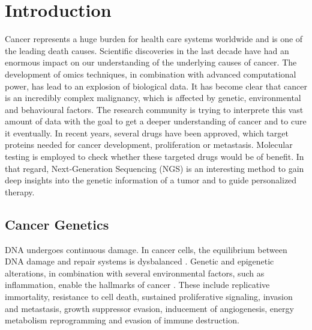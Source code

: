 \section{Introduction}

  Cancer represents a huge burden for health care systems worldwide and is one
  of the leading death causes. Scientific discoveries in the last decade have
  had an enormous impact on our understanding of the underlying causes of
  cancer. The development of omics techniques, in combination with advanced
  computational power, has lead to an explosion of biological data. It has
  become clear that cancer is an incredibly complex malignancy, which is
  affected by genetic, environmental and behavioural factors. The research
  community is trying to interprete this vast amount of data with the goal to
  get a deeper understanding of cancer and to cure it eventually. In recent
  years, several drugs have been approved, which target proteins needed for
  cancer development, proliferation or metastasis. Molecular testing is employed
  to check whether these targeted drugs would be of benefit. In that regard,
  Next-Generation Sequencing (NGS) is an interesting method to gain deep
  insights into the genetic information of a tumor and to guide personalized
  therapy.

  \subsection{Cancer Genetics}

    DNA undergoes continuous damage. In cancer cells, the equilibrium
    between DNA damage and repair systems is dysbalanced
    {\cite{dna_repair_epidemioloy}}. Genetic and epigenetic alterations, in
    combination with several environmental factors, such as inflammation, enable
    the hallmarks of cancer {\cite{cancer_hallmarks}}. These include replicative
    immortality, resistance to cell death, sustained proliferative signaling,
    invasion and metastasis, growth suppressor evasion, inducement of
    angiogenesis, energy metabolism reprogramming and evasion of immune
    destruction.

